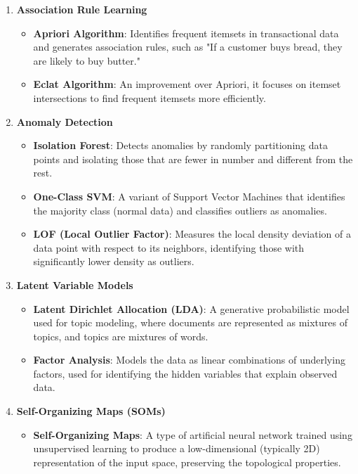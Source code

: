 \documentclass{article}
\begin{document}
\begin{enumerate}
    \item \textbf{Association Rule Learning}
    \begin{itemize}
        \item \textbf{Apriori Algorithm}: Identifies frequent itemsets in transactional data and generates association rules, such as "If a customer buys bread, they are likely to buy butter."
        \item \textbf{Eclat Algorithm}: An improvement over Apriori, it focuses on itemset intersections to find frequent itemsets more efficiently.
    \end{itemize}

    \item \textbf{Anomaly Detection}
    \begin{itemize}
        \item \textbf{Isolation Forest}: Detects anomalies by randomly partitioning data points and isolating those that are fewer in number and different from the rest.
        \item \textbf{One-Class SVM}: A variant of Support Vector Machines that identifies the majority class (normal data) and classifies outliers as anomalies.
        \item \textbf{LOF (Local Outlier Factor)}: Measures the local density deviation of a data point with respect to its neighbors, identifying those with significantly lower density as outliers.
    \end{itemize}

    \item \textbf{Latent Variable Models}
    \begin{itemize}
        \item \textbf{Latent Dirichlet Allocation (LDA)}: A generative probabilistic model used for topic modeling, where documents are represented as mixtures of topics, and topics are mixtures of words.
        \item \textbf{Factor Analysis}: Models the data as linear combinations of underlying factors, used for identifying the hidden variables that explain observed data.
    \end{itemize}

    \item \textbf{Self-Organizing Maps (SOMs)}
    \begin{itemize}
        \item \textbf{Self-Organizing Maps}: A type of artificial neural network trained using unsupervised learning to produce a low-dimensional (typically 2D) representation of the input space, preserving the topological properties.
    \end{itemize}


\end{enumerate}
\end{document}

